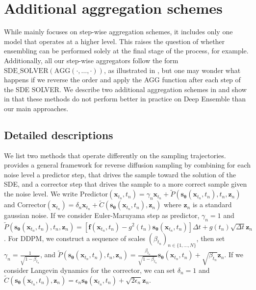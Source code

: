 \documentclass[10pt]{article} %
\def\rvx{{\mathbf{x}}}
\def\rvz{{\mathbf{z}}}
\def\vtheta{{\bm{\theta}}}
\def\vs{{\bm{s}}}
\begin{document}
\section{Additional aggregation schemes} \label{app: high level ensemble}

While  mainly focuses on step-wise aggregation schemes, it includes only one model that operates at a higher level. This raises the question of whether ensembling can be performed solely at the final stage of the process, for example. Additionally, all our step-wise aggregators follow the form $\text{SDE\_SOLVER}(\text{AGG}(\cdot,\dots,\cdot))$, as illustrated in , but one may wonder what happens if we reverse the order and apply the AGG function after each step of the SDE SOLVER. We describe two additional aggregation schemes in  and show in  that these methods do not perform better in practice on Deep Ensemble than our main approaches.

\subsection{Detailed descriptions}\label{app: description detaille high level ensemble}

We list two methods that operate differently on the sampling trajectories. \citet{song2021scorebasedgenerativemodelingstochastic} provides a general framework for reverse diffusion sampling by combining for each noise level a predictor step, that drives the sample toward the solution of the SDE, and a corrector step that drives the sample to a more correct sample given the noise level. We write  $\text{Predictor}(\rvx_{t_n}, t_n) =\gamma_{n}\rvx_{t_n} +\tilde{P}(\vs_{\vtheta}(\rvx_{t_n},t_n), t_n, \rvz_n)$ and $\text{Corrector}(\rvx_{t_n}) = \delta_n \rvx_{t_n} + \tilde{C}(\vs_{\vtheta}(\rvx_{t_n},t_n), \rvz_n)$ where $\rvz_n$ is a standard gaussian noise. If we consider Euler-Maruyama step as predictor, $\gamma_n = 1$ and $\tilde{P}(\vs_{\vtheta}(\rvx_{t_n},t_n), t_n, \rvz_n) =\left[\mathbf{f}(\rvx_{t_{n}},t_{n}) - g^2(t_n) \vs_{\vtheta}(\rvx_{t_n}, t_n)\right] \Delta t + g(t_n) \sqrt{\Delta t} \rvz_n$. For DDPM, we construct a sequence of scales $(\beta_{t_n})_{n\in \{1,\dots,N\}}$, then set $\gamma_n = \frac{1}{\sqrt{1 - \beta_{t_n}}}$, and $\tilde{P}(\vs_{\vtheta}(\rvx_{t_n},t_n), t_n, \rvz_n) = \frac{\beta_{t_n}}{\sqrt{1 - \beta_{t_n}}} \vs_{\vtheta}(\rvx_{t_n}, t_n)  + \sqrt{\beta_{t_n}} \rvz_n$. If we consider Langevin dynamics for the corrector, we can set $\delta_n = 1$ and $\tilde{C}(\vs_{\vtheta}(\rvx_{t_n},t_n), \rvz_n) = \epsilon_n \vs_{\vtheta}(\rvx_{t_n},t_n) + \sqrt{2\epsilon_n} \rvz_n$.  
\end{document}
